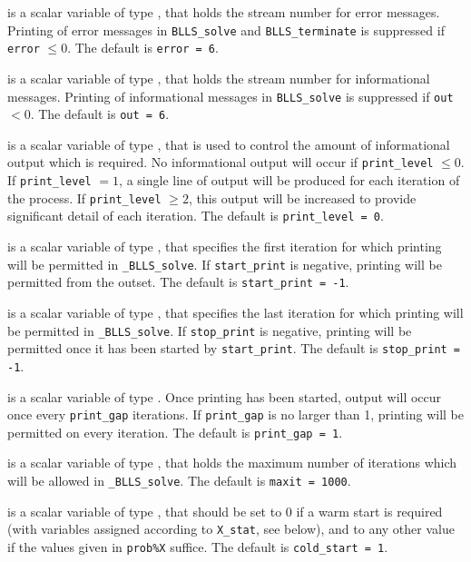 \documentclass{galahad}
\newcommand{\packagename}{BLLS}
\newcommand{\fullpackagename}{\libraryname\_\packagename}
\newcommand{\solver}{{\tt \fullpackagename\_solve}}
\begin{document}
\begin{description}

 is a scalar variable of type \integer, that holds the
stream number for error messages. Printing of error messages in
{\tt \packagename\_solve} and {\tt \packagename\_terminate}
is suppressed if {\tt error} $\leq 0$.
The default is {\tt error = 6}.

 is a scalar variable of type \integer, that holds the
stream number for informational messages. Printing of informational messages in
{\tt \packagename\_solve} is suppressed if {\tt out} $< 0$.
The default is {\tt out = 6}.

 is a scalar variable of type \integer, that is used
to control the amount of informational output which is required. No
informational output will occur if {\tt print\_level} $\leq 0$. If
{\tt print\_level} $= 1$, a single line of output will be produced for each
iteration of the process. If {\tt print\_level} $\geq 2$, this output will be
increased to provide significant detail of each iteration.
The default is {\tt print\_level = 0}.

 is a scalar variable of type \integer, that specifies
the first iteration for which printing will be permitted in \solver.
If {\tt start\_print} is negative, printing will be permitted from the outset.
The default is {\tt start\_print = -1}.

 is a scalar variable of type \integer, that specifies
the last iteration for which printing will be permitted in  \solver.
If {\tt stop\_print} is negative, printing will be permitted once it has been
started by {\tt start\_print}.
The default is {\tt stop\_print = -1}.

 is a scalar variable of type \integer.
Once printing has been started, output will occur once every
{\tt print\_gap} iterations. If {\tt print\_gap} is no larger than 1,
printing will be permitted on every iteration.
The default is {\tt print\_gap = 1}.

 is a scalar variable of type \integer, that holds the
maximum number of iterations which will be allowed in \solver.
The default is {\tt maxit = 1000}.

 is a scalar variable of type \integer, that
should be set to 0 if a warm start is required (with variables
assigned according to {\tt X\_stat}, see below), and to any other value if the
values given in {\tt prob\%X} suffice.
The default is {\tt cold\_start = 1}.


\end{description}
\end{document}
